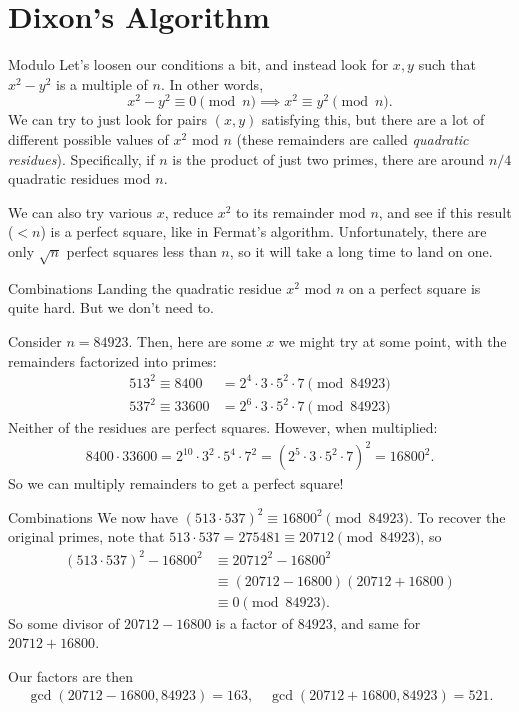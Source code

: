 \documentclass[aspectratio=169]{beamer}
\begin{document}
\section{Dixon's Algorithm}
\frame{\sectionpage}

\begin{frame}{Modulo}
  Let's loosen our conditions a bit, and instead look for $x, y$ such that
  $x^2 - y^2$ is a multiple of $n$. In other words,
  $$x^2 - y^2 \equiv 0 \pmod{n} \implies x^2 \equiv y^2 \pmod{n}.$$
  \pause
  We can try to just look for pairs $(x, y)$ satisfying this,
  but there are a lot of different possible values of $x^2$ mod $n$
  (these remainders are called \textit{quadratic residues}). Specifically,
  if $n$ is the product of just two primes, there are around $n/4$
  quadratic residues mod $n$.
  \pause

  We can also try various $x$, reduce $x^2$ to its remainder mod $n$,
  and see if this result ($<n$) is a perfect square,
  like in Fermat's algorithm.
  Unfortunately, there are only $\sqrt{n}$ perfect squares less than $n$,
  so it will take a long time to land on one.
  \pause
\end{frame}

\begin{frame}{Combinations}
  Landing the quadratic residue $x^2$ mod $n$ on a perfect square is quite hard. But we don't need to.
  \pause

  Consider $n = 84923$.
  Then, here are some $x$ we might try at some point, with the remainders
  factorized into primes: 
  \begin{align*}
    513^2 \equiv 8400 &= 2^4 \cdot 3 \cdot 5^2 \cdot 7 \pmod{84923} \\
    537^2 \equiv 33600 &= 2^6 \cdot 3 \cdot 5^2 \cdot 7 \pmod{84923}
  \end{align*} \pause
  Neither of the residues are perfect squares. However, when multiplied:
  \begin{align*}
    8400 \cdot 33600 = 2^{10} \cdot 3^2 \cdot 5^4 \cdot 7^2
    = (2^5 \cdot 3 \cdot 5^2 \cdot 7)^2 = 16800^2.
  \end{align*} \pause
  So we can multiply remainders to get a perfect square!
\end{frame}

\begin{frame}{Combinations}
  We now have $(513 \cdot 537)^2 \equiv 16800^2 \pmod{84923}$.
  To recover the original primes, note that
  $513 \cdot 537 = 275481 \equiv 20712 \pmod{84923}$, so \pause
  \begin{align*}
    (513 \cdot 537)^2 - 16800^2 &\equiv 20712^2 - 16800^2 \\
    &\equiv (20712 - 16800)(20712 + 16800) \\
    &\equiv 0 \pmod{84923}.
  \end{align*}
  So some divisor of $20712-16800$ is a factor of $84923$,
  and same for $20712+16800$.
  \pause

  Our factors are then
  \begin{align*}
    \gcd(20712-16800, 84923) = 163, \quad
    \gcd(20712+16800, 84923) = 521.
  \end{align*}
\end{frame}
\end{document}
